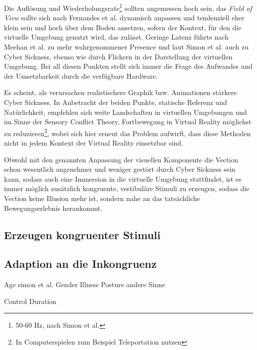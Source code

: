 Die Aufl\"osung und Wiederholungsrate\footnote{50-60 Hz, nach Simon et al.\cite{Simon:2014:Factors}} sollten angemessen hoch sein\cite{kirollos:2019:refresh}, das \textit{Field of View} sollte sich nach Fernandes et al.\cite{Fenandes:2016:FOV} dynamisch anpassen und tendenziell eher klein sein und hoch \"uber dem Boden ansetzen, sofern der Kontext, für den die virtuelle Umgebung genutzt wird, das zulässt. Geringe Latenz f\"uhrte nach Meehan et al.\cite{Meehan:2003:latency} zu mehr wahrgenommener Presence und laut Simon et al.\cite{Simon:2014:Factors} auch zu Cyber Sickness, ebenso wie durch Flickern in der Darstellung der virtuellen Umgebung.
Bei all diesen Punkten stellt sich immer die Frage des Aufwandes und der Umsetzbarkeit durch die verfügbare Hardware.

Es scheint, als verursachen realistischere Graphik bzw. Animationen stärkere Cyber Sickness\cite{Pouke:2018:Realism}.
In Anbetracht der beiden Punkte, statische Referenz und Natürlichkeit, empfehlen sich weite Landschaften in virtuellen Umgebungen und im Sinne der Sensory Conflict Theory, Fortbewegung in Virtual Reality m\"oglichst zu reduzieren\footnote{In Computerspielen zum Beispiel Teleportation nutzen}, wobei sich hier erneut das Problem aufwirft, dass diese Methoden nicht in jedem Kontext der Virtual Reality einsetzbar sind.

Obwohl mit den genannten Anpassung der visuellen Komponente die Vection schon wesentlich angenehmer und weniger gestört durch Cyber Sickness sein kann, sodass auch eine Immersion in die virtuelle Umgebung stattfindet, ist es immer möglich zusätzlich kongruente, vestibuläre Stimuli zu erzeugen, sodass die Vection keine Illusion mehr ist, sondern nahe an das tatsächliche Bewegungserlebnis herankommt.


\subsection{Erzeugen kongruenter Stimuli}\label{Vestibular}



\subsection{Adaption an die Inkongruenz}\label{Adaptation}
Age simon et al.
Gender 
Illness
Posture
andere Sinne

Control
Duration